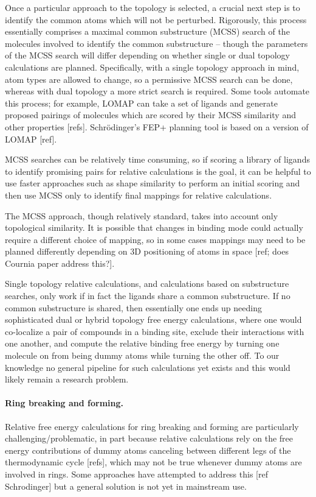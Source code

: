\documentclass[9pt,bestpractices]{livecoms}
\begin{document}
Once a particular approach to the topology is selected, a crucial next step is to identify the common atoms which will not be perturbed.
Rigorously, this process essentially comprises a maximal common substructure (MCSS) search of the molecules involved to identify the common substructure -- though the parameters of the MCSS search will differ depending on whether single or dual topology calculations are planned.
Specifically, with a single topology approach in mind, atom types are allowed to change, so a permissive MCSS search can be done, whereas with dual topology a more strict search is required.
Some tools automate this process; for example, LOMAP can take a set of ligands and generate proposed pairings of molecules which are scored by their MCSS similarity and other properties [refs].
Schr\"{o}dinger's FEP+ planning tool is based on a version of LOMAP [ref].

MCSS searches can be relatively time consuming, so if scoring a library of ligands to identify promising pairs for relative calculations is the goal, it can be helpful to use faster approaches such as shape similarity to perform an initial scoring and then use MCSS only to identify final mappings for relative calculations.

The MCSS approach, though relatively standard, takes into account only topological similarity.
It is possible that changes in binding mode could actually require a different choice of mapping, so in some cases mappings may need to be planned differently depending on 3D positioning of atoms in space [ref; does Cournia paper address this?].

Single topology relative calculations, and calculations based on substructure searches, only work if in fact the ligands share a common substructure.
If no common substructure is shared, then essentially one ends up needing sophisticated dual or hybrid topology free energy calculations, where one would co-localize a pair of compounds in a binding site, exclude their interactions with one another, and compute the relative binding free energy by turning one molecule on from being dummy atoms while turning the other off.
To our knowledge no general pipeline for such calculations yet exists and this would likely remain a research problem.

\paragraph{Ring breaking and forming.} Relative free energy calculations for ring breaking and forming are particularly challenging/problematic, in part because relative calculations rely on the free energy contributions of dummy atoms canceling between different legs of the thermodynamic cycle [refs], which may not be true whenever dummy atoms are involved in rings.
Some approaches have attempted to address this [ref Schrodinger] but a general solution is not yet in mainstream use.
\end{document}
